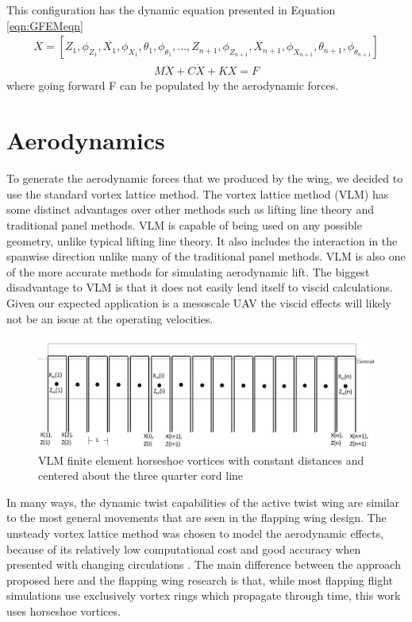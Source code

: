 \documentclass[11pt]{ucthesis}
\begin{document}
This configuration has the dynamic equation presented in Equation \ref{eqn:GFEMeqn}
\begin{eqnarray}
X = [Z_1,\phi_{Z_1}, X_1,\phi_{X_1},\theta_1,\phi_{\theta_1}, \ldots,Z_{n+1},\phi_{Z_{n+1}}, X_{n+1},\phi_{X_{n+1}},\theta_{n+1},\phi_{\theta_{n+1}}]
\end{eqnarray}
\begin{eqnarray}
M\ddot{X}+C\dot{X}+KX = F
\label{eqn:GFEMeqn}
\end{eqnarray}
where going forward F can be populated by the aerodynamic forces.

\section{Aerodynamics}
\label{sec:aeroModel}
To generate the aerodynamic forces that we produced by the wing, we decided to use the standard vortex lattice method. The vortex lattice method (VLM) has some distinct advantages over other methods such as lifting line theory and traditional panel methods. VLM is capable of being used on any possible geometry, unlike typical lifting line theory. It also includes the interaction in the spanwise direction unlike many of the traditional panel methods. VLM is also one of the more accurate methods for simulating aerodynamic lift. \cite{bertin1998aerodynamics} The biggest disadvantage to VLM is that it does not easily lend itself to viscid calculations. Given our expected application is a mesoscale UAV the viscid effects will likely not be an issue at the operating velocities.
\begin{figure}[thpb]
\centering
\includegraphics[width=1\linewidth]{Figures/VortexLaticeMethod.jpg}
\caption{VLM finite element horseshoe vortices with constant distances and centered about the three quarter cord line}
\label{fig:VLM}
\end{figure}

In many ways, the dynamic twist capabilities of the active twist wing are similar to the most general movements that are seen in the flapping wing design. The unsteady vortex lattice method was chosen to model the aerodynamic effects, because of its relatively low computational cost and good accuracy when presented with changing circulations \cite{long2004object,stanford2010analytical,de2012object}. The main difference between the approach proposed here and the flapping wing research is that, while most flapping flight simulations use exclusively vortex rings which propagate through time, this work uses horseshoe vortices. 
\end{document}
